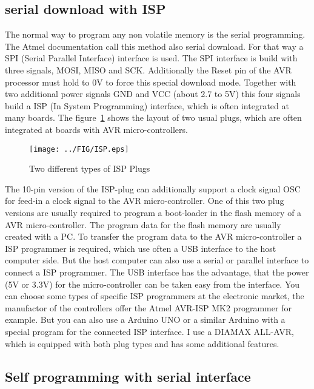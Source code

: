\subsection{serial download with ISP}

The normal way to program any non volatile memory is the serial programming.
The Atmel documentation call this method also serial download.
For that way a SPI (Serial Parallel Interface) interface is used.
The SPI interface is build with three signals, MOSI, MISO and SCK.
Additionally the Reset pin of the AVR processor must hold to 0V to force
this special download mode.
Together with two additional power signals GND and VCC (about 2.7 to 5V) this
four signals build a ISP (In System Programming) interface, which is often
integrated at many boards.
The figure~\ref{fig:ISP} shows the layout of two usual plugs, which are
often integrated at boards with AVR micro-controllers.

\begin{figure}[H]
\centering
\texttt{[image: ../FIG/ISP.eps]}
\caption{Two different types of ISP Plugs}
\label{fig:ISP}
\end{figure}

The 10-pin version of the ISP-plug can additionally support a clock signal OSC
for feed-in a clock signal to the AVR micro-controller.
One of this two plug versions are usually required to program a boot-loader in
the flash memory of a AVR micro-controller. The program data
for the flash memory are usually created with a PC.
To transfer the program data to the AVR micro-controller a ISP programmer
is required, which use often a USB interface to the host computer side.
But the host computer can also use a serial or parallel interface to
connect a ISP programmer.
The USB interface has the advantage, that the power (5V or 3.3V) for
the micro-controller can be taken easy from the interface.
You can choose some types of specific ISP programmers at the electronic market,
the manufactor of the controllers offer the Atmel AVR-ISP MK2 programmer for example.
But you can also use a Arduino UNO or a similar Arduino with
a special program for the connected ISP interface.
I use a DIAMAX ALL-AVR, which is equipped with both plug types
and has some additional features.

\subsection{Self programming with serial interface}

